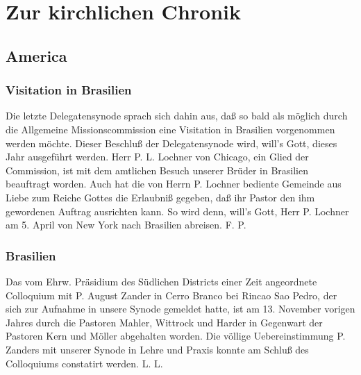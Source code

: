 \chapter{Zur kirchlichen Chronik}

\section{America}

\subsection{Visitation in Brasilien}
Die letzte Delegatensynode sprach sich dahin aus, daß so bald als möglich durch die Allgemeine Missionscommission eine Visitation in Brasilien vorgenommen werden möchte. Dieser Beschluß der Delegatensynode wird, will’s Gott, dieses Jahr ausgeführt werden. Herr P. L. Lochner von Chicago, ein Glied der Commission, ist mit dem amtlichen Besuch unserer Brüder in Brasilien beauftragt worden. Auch hat die von Herrn P. Lochner bediente Gemeinde aus Liebe zum Reiche Gottes die Erlaubniß gegeben, daß ihr Pastor den ihm gewordenen Auftrag ausrichten kann. So wird denn, will’s Gott, Herr P. Lochner am 5. April von New York nach Brasilien abreisen. F. P.

\subsection{Brasilien}
Das vom Ehrw. Präsidium des Südlichen Districts einer Zeit angeordnete Colloquium mit P. August Zander in Cerro Branco bei Rincao Sao Pedro, der sich zur Aufnahme in unsere Synode gemeldet hatte, ist am 13. November vorigen Jahres durch die Pastoren Mahler, Wittrock und Harder in Gegenwart der Pastoren Kern und Möller abgehalten worden. Die völlige Uebereinstimmung P. Zanders mit unserer Synode in Lehre und Praxis konnte am Schluß des Colloquiums constatirt werden. L. L.

